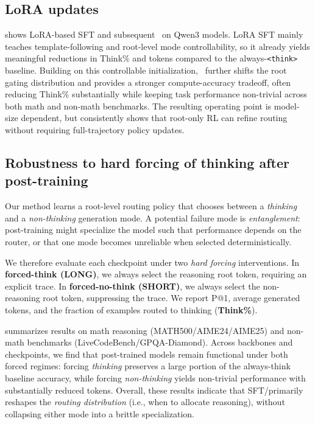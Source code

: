 \subsection{LoRA updates}
 shows LoRA-based SFT and subsequent \Ours~on Qwen3 models. LoRA SFT mainly teaches template-following and root-level mode controllability, so it already yields meaningful reductions in Think\% and tokens compared to the always-\texttt{<think>} baseline. Building on this controllable initialization, \Ours~further shifts the root gating distribution and provides a stronger compute-accuracy tradeoff, often reducing Think\% substantially while keeping task performance non-trivial across both math and non-math benchmarks. 
The resulting operating point is model-size dependent, but consistently shows that root-only RL can refine routing without requiring full-trajectory policy updates.

\subsection{Robustness to hard forcing of thinking after post-training}
\label{sec:forced_mode}

Our method learns a root-level routing policy that chooses between a \emph{thinking} and a \emph{non-thinking} generation mode.
A potential failure mode is \emph{entanglement}: post-training might specialize the model such that performance depends on the router,
or that one mode becomes unreliable when selected deterministically.

We therefore evaluate each checkpoint under two \emph{hard forcing} interventions.
In \textbf{forced-think (LONG)}, we always select the reasoning root token, requiring an explicit trace.
In \textbf{forced-no-think (SHORT)}, we always select the non-reasoning root token, suppressing the trace.
We report P@1, average generated tokens, and the fraction of examples routed to thinking (\textbf{Think\%}).

 summarizes results on math reasoning (MATH500/AIME24/AIME25) and non-math benchmarks
(LiveCodeBench/GPQA-Diamond).
Across backbones and checkpoints, we find that post-trained models remain functional under both forced regimes:
forcing \emph{thinking} preserves a large portion of the always-think baseline accuracy, while forcing \emph{non-thinking} yields
non-trivial performance with substantially reduced tokens.
Overall, these results indicate that SFT/\Ours primarily reshapes the \emph{routing distribution} (i.e., when to allocate reasoning),
without collapsing either mode into a brittle specialization.

